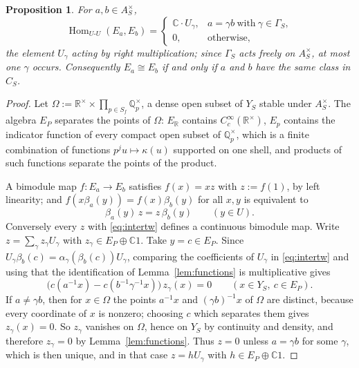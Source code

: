 \documentclass[11pt]{amsart}
\newtheorem{proposition}[theorem]{Proposition}
\theoremstyle{definition}
\theoremstyle{remark}
\newcommand{\C}{\mathbb C}
\newcommand{\R}{\mathbb R}
\newcommand{\Q}{\mathbb Q}
\newcommand{\Hom}{\operatorname{Hom}}
\begin{document}
\begin{proposition}\label{prop:hom}
For $a,b\in A_S^{\times}$,
\begin{equation}\label{eq:homclass}
\Hom_{U\text{-}U}(E_a,E_b)=
\begin{cases}
\C\cdot U_{\gamma}, & a=\gamma b\ \text{with}\ \gamma\in\Gamma_S,\\
0, & \text{otherwise},
\end{cases}
\end{equation}
the element $U_{\gamma}$ acting by right multiplication; since $\Gamma_S$ acts
freely on $A_S^{\times}$, at most one $\gamma$ occurs.  Consequently $E_a\cong
E_b$ if and only if $a$ and $b$ have the same class in $C_S$.
\end{proposition}

\begin{proof}
Let $\Omega:=\R^{\times}\times\prod_{p\in S_f}\Q_p^{\times}$, a dense open
subset of $Y_S$ stable under $A_S^{\times}$.  The algebra $E_P$ separates the
points of $\Omega$: $E_{\R}$ contains $C_c^{\infty}(\R^{\times})$, $E_p$
contains the indicator function of every compact open subset of
$\Q_p^{\times}$, which is a finite combination of functions
$p^{j}u\mapsto\kappa(u)$ supported on one shell, and products of such
functions separate the points of the product.

A bimodule map $f:E_a\to E_b$ satisfies $f(x)=xz$ with $z:=f(1)$, by left
linearity; and $f(x\beta_a(y))=f(x)\beta_b(y)$ for all $x,y$ is equivalent to
\begin{equation}\label{eq:intertw}
\beta_a(y)\,z=z\,\beta_b(y)\qquad(y\in U).
\end{equation}
Conversely every $z$ with \eqref{eq:intertw} defines a continuous bimodule
map.  Write $z=\sum_{\gamma}z_{\gamma}U_{\gamma}$ with $z_{\gamma}\in
E_P\oplus\C1$.  Take $y=c\in E_P$.  Since
$U_{\gamma}\beta_b(c)=\alpha_{\gamma}(\beta_b(c))U_{\gamma}$, comparing the
coefficients of $U_{\gamma}$ in \eqref{eq:intertw} and using that the
identification of Lemma~\ref{lem:functions} is multiplicative gives
\[
\bigl(c(a^{-1}x)-c(b^{-1}\gamma^{-1}x)\bigr)\,z_{\gamma}(x)=0
\qquad(x\in Y_S,\ c\in E_P).
\]
If $a\ne\gamma b$, then for $x\in\Omega$ the points $a^{-1}x$ and
$(\gamma b)^{-1}x$ of $\Omega$ are distinct, because every coordinate of $x$ is
nonzero; choosing $c$ which separates them gives $z_{\gamma}(x)=0$.  So
$z_{\gamma}$ vanishes on $\Omega$, hence on $Y_S$ by continuity and density,
and therefore $z_{\gamma}=0$ by Lemma~\ref{lem:functions}.
Thus $z=0$ unless $a=\gamma b$ for some $\gamma$, which is then unique, and in
that case $z=hU_{\gamma}$ with $h\in E_P\oplus\C1$.


\end{proof}
\end{document}
